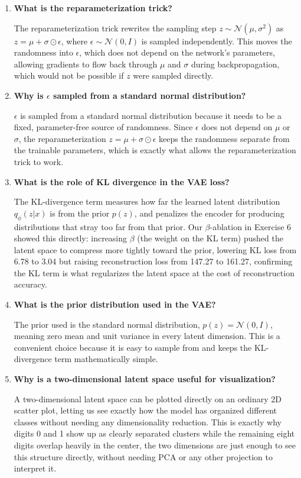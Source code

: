 \documentclass[10pt]{article}
\begin{document}
\begin{enumerate}
\item \textbf{What is the reparameterization trick?}

The reparameterization trick rewrites the sampling step $z \sim \mathcal{N}(\mu, \sigma^2)$ as $z = \mu + \sigma \odot \epsilon$, where $\epsilon \sim \mathcal{N}(0, I)$ is sampled independently. This moves the randomness into $\epsilon$, which does not depend on the network's parameters, allowing gradients to flow back through $\mu$ and $\sigma$ during backpropagation, which would not be possible if $z$ were sampled directly.

\item \textbf{Why is $\epsilon$ sampled from a standard normal distribution?}

$\epsilon$ is sampled from a standard normal distribution because it needs to be a fixed, parameter-free source of randomness. Since $\epsilon$ does not depend on $\mu$ or $\sigma$, the reparameterization $z = \mu + \sigma \odot \epsilon$ keeps the randomness separate from the trainable parameters, which is exactly what allows the reparameterization trick to work.

\item \textbf{What is the role of KL divergence in the VAE loss?}

The KL-divergence term measures how far the learned latent distribution $q_\phi(z|x)$ is from the prior $p(z)$, and penalizes the encoder for producing distributions that stray too far from that prior. Our $\beta$-ablation in Exercise 6 showed this directly: increasing $\beta$ (the weight on the KL term) pushed the latent space to compress more tightly toward the prior, lowering KL loss from 6.78 to 3.04 but raising reconstruction loss from 147.27 to 161.27, confirming the KL term is what regularizes the latent space at the cost of reconstruction accuracy.

\item \textbf{What is the prior distribution used in the VAE?}

The prior used is the standard normal distribution, $p(z) = \mathcal{N}(0, I)$, meaning zero mean and unit variance in every latent dimension. This is a convenient choice because it is easy to sample from and keeps the KL-divergence term mathematically simple.

\item \textbf{Why is a two-dimensional latent space useful for visualization?}

A two-dimensional latent space can be plotted directly on an ordinary 2D scatter plot, letting us see exactly how the model has organized different classes without needing any dimensionality reduction. This is exactly why digits 0 and 1 show up as clearly separated clusters while the remaining eight digits overlap heavily in the center, the two dimensions are just enough to see this structure directly, without needing PCA or any other projection to interpret it.


\end{enumerate}
\end{document}
